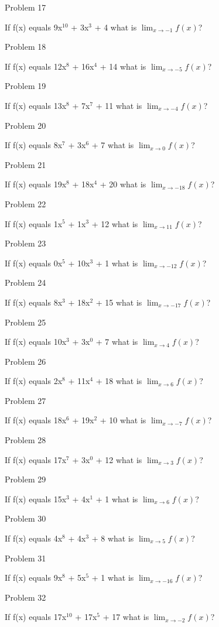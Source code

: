 \documentclass{article}
\begin{document}
Problem 17

If f(x) equals 9x$^{10}$ + 3x$^{3}$ + 4 what is $\lim_{x\to -1} f(x) $?

Problem 18

If f(x) equals 12x$^{8}$ + 16x$^{4}$ + 14 what is $\lim_{x\to -5} f(x) $?

Problem 19

If f(x) equals 13x$^{8}$ + 7x$^{7}$ + 11 what is $\lim_{x\to -4} f(x) $?

Problem 20

If f(x) equals 8x$^{7}$ + 3x$^{6}$ + 7 what is $\lim_{x\to 0} f(x) $?

Problem 21

If f(x) equals 19x$^{8}$ + 18x$^{4}$ + 20 what is $\lim_{x\to -18} f(x) $?

Problem 22

If f(x) equals 1x$^{5}$ + 1x$^{3}$ + 12 what is $\lim_{x\to 11} f(x) $?

Problem 23

If f(x) equals 0x$^{5}$ + 10x$^{3}$ + 1 what is $\lim_{x\to -12} f(x) $?

Problem 24

If f(x) equals 8x$^{3}$ + 18x$^{2}$ + 15 what is $\lim_{x\to -17} f(x) $?

Problem 25

If f(x) equals 10x$^{3}$ + 3x$^{0}$ + 7 what is $\lim_{x\to 4} f(x) $?

Problem 26

If f(x) equals 2x$^{8}$ + 11x$^{4}$ + 18 what is $\lim_{x\to 6} f(x) $?

Problem 27

If f(x) equals 18x$^{6}$ + 19x$^{2}$ + 10 what is $\lim_{x\to -7} f(x) $?

Problem 28

If f(x) equals 17x$^{7}$ + 3x$^{0}$ + 12 what is $\lim_{x\to 3} f(x) $?

Problem 29

If f(x) equals 15x$^{3}$ + 4x$^{1}$ + 1 what is $\lim_{x\to 6} f(x) $?

Problem 30

If f(x) equals 4x$^{8}$ + 4x$^{3}$ + 8 what is $\lim_{x\to 5} f(x) $?

Problem 31

If f(x) equals 9x$^{8}$ + 5x$^{5}$ + 1 what is $\lim_{x\to -16} f(x) $?

Problem 32

If f(x) equals 17x$^{10}$ + 17x$^{5}$ + 17 what is $\lim_{x\to -2} f(x) $?
\end{document}

